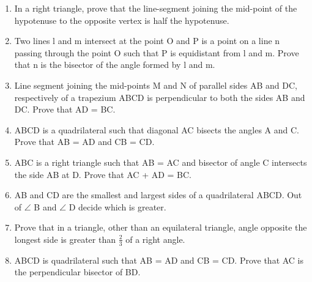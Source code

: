 \documentclass[11pt] {article}
\begin{document}
\begin {enumerate}
$\angle$ ABC is a right angle.
\item In a right triangle, prove that the line-segment joining the mid-point of the hypotenuse to the opposite vertex is half the hypotenuse.
\item Two lines l and m intersect at the point O and P is a point on a line n passing through the point O such that P is equidistant from l and m. Prove that n is the bisector of the angle formed by l and m.
\item Line segment joining the mid-points M and N of parallel sides AB and DC, respectively of a trapezium ABCD is perpendicular to both the sides AB and DC. Prove that AD = BC.
\item ABCD is a quadrilateral such that diagonal AC bisects the angles A and C. Prove that AB = AD and CB = CD.
\item ABC is a right triangle such that AB = AC and bisector of angle C intersects the side AB at D. Prove that AC + AD = BC.
\item AB and CD are the smallest and largest sides of a quadrilateral ABCD. Out of $\angle$ B and $\angle$ D decide which is greater.
\item Prove that in a triangle, other than an equilateral triangle, angle opposite the longest side is greater than $\frac{2}{3}$ of a right angle.
\item ABCD is quadrilateral such that AB = AD and CB = CD. Prove that AC is the perpendicular bisector of BD.



\end{enumerate}
\end{document}
